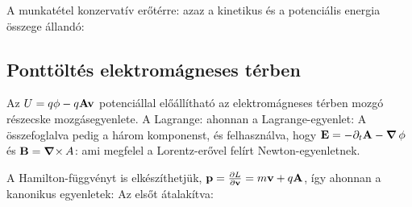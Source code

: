    A munkatétel konzervatív erőtérre:
   azaz a kinetikus és a potenciális energia összege állandó:
   
  \subsection{Ponttöltés elektromágneses térben}\label{ss:03-toltesEMterben}
   
   Az $U=q\phi-q\mathbf{A}\mathbf{v}$ potenciállal előállítható az elektromágneses térben mozgó részecske mozgásegyenlete. A Lagrange:
   ahonnan a Lagrange-egyenlet:
   A összefoglalva pedig a három komponenst, és felhasználva, hogy $\mathbf{E}=-\partial_t\mathbf{A}-\mathop{\boldsymbol{\nabla}}\nolimits{\phi}$ és $\mathbf{B}=\mathop{\boldsymbol{\nabla}\times}\nolimits{A}$:
   ami megfelel a Lorentz-erővel felírt Newton-egyenletnek. 
   
   A Hamilton-függvényt is elkészíthetjük, $\mathbf{p}=\frac{\partial L}{\partial \mathbf{v}}=m\mathbf{v}+q\mathbf{A}$, így
   ahonnan a kanonikus egyenletek:
   Az elsőt átalakítva:
   
